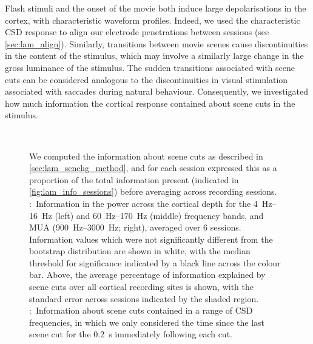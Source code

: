 Flash stimuli and the onset of the movie both induce large depolarisations in the cortex, with characteristic waveform profiles.
Indeed, we used the characteristic \ac{CSD} response to align our electrode penetrations between sessions (see \autoref{sec:lam_align}).
Similarly, transitions between movie scenes cause discontinuities in the content of the stimulus, which may involve a similarly large change in the gross luminance of the stimulus.
The sudden transitions associated with scene cuts can be considered analogous to the discontinuities in visual stimulation associated with saccades during natural behaviour.
Consequently, we investigated how much information the cortical response contained about scene cuts in the stimulus.

\begin{figure}[htbp]
\centering
{}
\\
%
\caption{
We computed the information about scene cuts as described in \autoref{sec:lam_scnchg_method}, and for each session expressed this as a proportion of the total information present (indicated in \autoref{fig:lam_info_sessions}) before averaging across recording sessions.
\protect{}:~Information in the power across the cortical depth for the \SIrange{4}{16}{Hz} (left) and \SIrange{60}{170}{Hz} (middle) frequency bands, and \ac{MUA} (\SIrange{900}{3000}{Hz}; right), averaged over \num{6} sessions.
Information values which were not significantly different from the bootstrap distribution are shown in white, with the median threshold for significance indicated by a black line across the colour bar.
Above, the average percentage of information explained by scene cuts over all cortical recording sites is shown, with the standard error across sessions indicated by the shaded region.
\protect{}:~Information about scene cuts contained in a range of \ac{CSD} frequencies, in which we only considered the time since the last scene cut for the \SI{0.2}{\second} immediately following each cut.
}%
\label{fig:lam_scnchg}
%
\end{figure}

